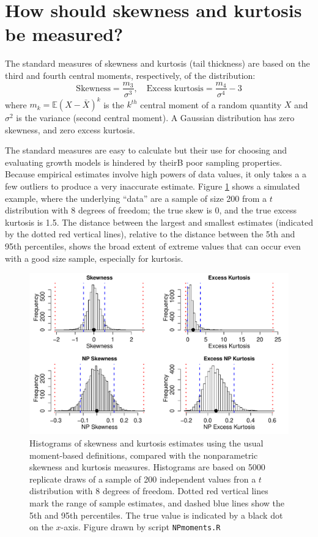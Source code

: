 \documentclass[12pt]{article}
\newcounter{box}
\newcommand{\be}{\begin{equation}}
\newcommand{\ee}{\end{equation}}
\begin{document}
\section{How should skewness and kurtosis be measured?}
The standard measures of skewness and kurtosis (tail thickness) are based on the third and fourth central moments, respectively, of the distribution: 
\be
\mbox{Skewness} = \frac{m_3}{\sigma^3}, \quad \mbox{Excess kurtosis} = \frac{m_4}{\sigma^4}-3
\ee
where $m_k = \mathbb{E}(X - \bar{X})^k$ is the $k^{th}$ central moment of a random quantity $X$ 
and $\sigma^2$ is the variance (second central moment). A Gaussian distribution has zero skewness, 
and zero excess kurtosis. 

The standard measures are easy to calculate but their use for choosing and evaluating growth models is hindered by theirB
poor sampling properties. Because empirical estimates involve high powers of data values, it only takes a 
a few outliers to produce a very inaccurate estimate. Figure \ref{fig:NPmoments} shows a simulated example, where the
underlying ``data'' are a sample of size 200 from a $t$ distribution with 8 degrees of freedom; the true skew is 0, and the 
true excess kurtosis is 1.5. The distance between the largest and smallest estimates (indicated by the dotted red
vertical lines), relative to the distance between the 5th and 95th percentiles, shows the broad extent of 
extreme values that can occur even with a good size sample, especially for kurtosis. 

\begin{figure}[tbp]
\centering
\includegraphics[width=\textwidth]{figures/NPmoments.pdf}
\caption{Histograms of skewness and kurtosis estimates using the usual moment-based definitions, compared with the nonparametric
skewness and kurtosis measures. Histograms are based on 5000 replicate draws of a sample of 200 independent values fron 
a $t$ distribution with 8 degrees of freedom. Dotted red vertical lines mark the range of sample estimates, 
and dashed blue lines show the 5th and 95th percentiles. The true value is indicated by a black dot on the $x$-axis.
Figure drawn by script \texttt{NPmoments.R}}
\label{fig:NPmoments}
\end{figure} 
\end{document}
